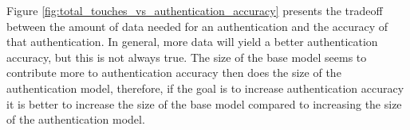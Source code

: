 \documentclass{acm_proc_article-sp}
\begin{document}
%
Figure \ref{fig:total_touches_vs_authentication_accuracy} presents the tradeoff between the amount of data needed for an authentication and the accuracy of that authentication.
In general, more data will yield a better authentication accuracy, but this is not always true.
The size of the base model seems to contribute more to authentication accuracy then does the size of the authentication model, therefore, if the goal is to increase authentication accuracy it is better to increase the size of the base model compared to increasing the size of the authentication model.



%
\end{document}
